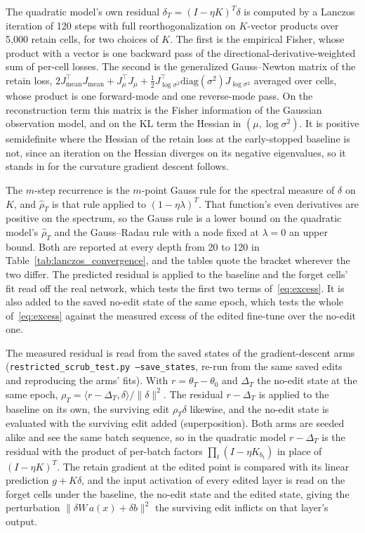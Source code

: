 \documentclass{article}
\begin{document}
The quadratic model's own residual $\delta_T = (I - \eta K)^T\delta$ is computed by a Lanczos iteration of 120 steps with full reorthogonalization on $K$-vector products over 5,000 retain cells, for two choices of $K$. The first is the empirical Fisher, whose product with a vector is one backward pass of the directional-derivative-weighted sum of per-cell losses. The second is the generalized Gauss--Newton matrix of the retain loss, $2 J_{\mathrm{mean}}^\top J_{\mathrm{mean}} + J_{\mu}^\top J_{\mu} + \tfrac12 J_{\log\sigma^2}^\top \mathrm{diag}(\sigma^2) J_{\log\sigma^2}$ averaged over cells, whose product is one forward-mode and one reverse-mode pass. On the reconstruction term this matrix is the Fisher information of the Gaussian observation model, and on the KL term the Hessian in $(\mu, \log\sigma^2)$. It is positive semidefinite where the Hessian of the retain loss at the early-stopped baseline is not, since an iteration on the Hessian diverges on its negative eigenvalues, so it stands in for the curvature gradient descent follows.

The $m$-step recurrence is the $m$-point Gauss rule for the spectral measure of $\delta$ on $K$, and $\hat\rho_T$ is that rule applied to $(1 - \eta\lambda)^T$. That function's even derivatives are positive on the spectrum, so the Gauss rule is a lower bound on the quadratic model's $\hat\rho_T$ and the Gauss--Radau rule with a node fixed at $\lambda = 0$ an upper bound. Both are reported at every depth from 20 to 120 in Table~\ref{tab:lanczos_convergence}, and the tables quote the bracket wherever the two differ. The predicted residual is applied to the baseline and the forget cells' fit read off the real network, which tests the first two terms of~\eqref{eq:excess}. It is also added to the saved no-edit state of the same epoch, which tests the whole of~\eqref{eq:excess} against the measured excess of the edited fine-tune over the no-edit one.

The measured residual is read from the saved states of the gradient-descent arms (\texttt{restricted\_scrub\_test.py --save\_states}, re-run from the same saved edits and reproducing the arms' fits). With $r = \theta_T - \theta_0$ and $\Delta_T$ the no-edit state at the same epoch, $\rho_T = \langle r - \Delta_T, \delta\rangle / \|\delta\|^2$. The residual $r - \Delta_T$ is applied to the baseline on its own, the surviving edit $\rho_T \delta$ likewise, and the no-edit state is evaluated with the surviving edit added (superposition). Both arms are seeded alike and see the same batch sequence, so in the quadratic model $r - \Delta_T$ is the residual with the product of per-batch factors $\prod_t (I - \eta K_{b_t})$ in place of $(I - \eta K)^T$. The retain gradient at the edited point is compared with its linear prediction $g + K\delta$, and the input activation of every edited layer is read on the forget cells under the baseline, the no-edit state and the edited state, giving the perturbation $\|\delta W\, a(x) + \delta b\|^2$ the surviving edit inflicts on that layer's output.
\end{document}
